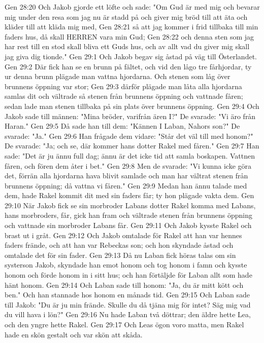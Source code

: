 Gen 28:20  Och Jakob gjorde ett löfte och sade: "Om Gud är med mig och bevarar mig under den resa som jag nu är stadd på och giver mig bröd till att äta och kläder till att kläda mig med,
Gen 28:21  så att jag kommer i frid tillbaka till min faders hus, då skall HERREN vara min Gud;
Gen 28:22  och denna sten som jag har rest till en stod skall bliva ett Guds hus, och av allt vad du giver mig skall jag giva dig tionde."
Gen 29:1  Och Jakob begav sig åstad på väg till Österlandet.
Gen 29:2  Där fick han se en brunn på fältet, och vid den lågo tre fårhjordar, ty ur denna brunn plägade man vattna hjordarna. Och stenen som låg över brunnens öppning var stor;
Gen 29:3  därför plägade man låta alla hjordarna samlas dit och vältrade så stenen från brunnens öppning och vattnade fåren; sedan lade man stenen tillbaka på sin plats över brunnens öppning.
Gen 29:4  Och Jakob sade till männen: "Mina bröder, varifrån ären I?" De svarade: "Vi äro från Haran."
Gen 29:5  Då sade han till dem: "Kännen I Laban, Nahors son?" De svarade: "Ja."
Gen 29:6  Han frågade dem vidare: "Står det väl till med honom?" De svarade: "Ja; och se, där kommer hans dotter Rakel med fåren."
Gen 29:7  Han sade: "Det är ju ännu full dag; ännu är det icke tid att samla boskapen. Vattnen fåren, och fören dem åter i bet."
Gen 29:8  Men de svarade: "Vi kunna icke göra det, förrän alla hjordarna hava blivit samlade och man har vältrat stenen från brunnens öppning; då vattna vi fåren."
Gen 29:9  Medan han ännu talade med dem, hade Rakel kommit dit med sin faders får; ty hon plägade vakta dem.
Gen 29:10  När Jakob fick se sin morbroder Labans dotter Rakel komma med Labans, hans morbroders, får, gick han fram och vältrade stenen från brunnens öppning och vattnade sin morbroder Labans får.
Gen 29:11  Och Jakob kysste Rakel och brast ut i gråt.
Gen 29:12  Och Jakob omtalade för Rakel att han var hennes faders frände, och att han var Rebeckas son; och hon skyndade åstad och omtalade det för sin fader.
Gen 29:13  Då nu Laban fick höras talas om sin systerson Jakob, skyndade han emot honom och tog honom i famn och kysste honom och förde honom in i sitt hus; och han förtäljde för Laban allt som hade hänt honom.
Gen 29:14  Och Laban sade till honom: "Ja, du är mitt kött och ben." Och han stannade hos honom en månads tid.
Gen 29:15  Och Laban sade till Jakob: "Du är ju min frände. Skulle du då tjäna mig för intet? Säg mig vad du vill hava i lön?"
Gen 29:16  Nu hade Laban två döttrar; den äldre hette Lea, och den yngre hette Rakel.
Gen 29:17  Och Leas ögon voro matta, men Rakel hade en skön gestalt och var skön att skåda.
